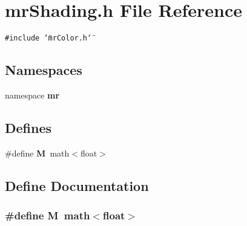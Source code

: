 \section{mr\-Shading.h File Reference}
\label{mrShading_8h}
{\tt \#include \char`\"{}mr\-Color.h\char`\"{}}\par
\subsection*{Namespaces}
\begin{CompactItemize}
\item 
namespace {\bf mr}
\end{CompactItemize}
\subsection*{Defines}
\begin{CompactItemize}
\item 
\#define {\bf M}\ math$<$float$>$
\end{CompactItemize}


\subsection{Define Documentation}
\subsubsection{\setlength{\rightskip}{0pt plus 5cm}\#define M\ math$<$float$>$}\label{mrShading_8h_a0}


